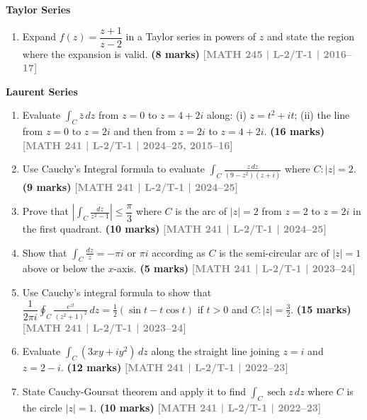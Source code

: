 \documentclass[12pt,a4paper]{article}
\newcommand{\yr}[1]{\hfill\textcolor{gray}{\small\textbf{[#1]}}}
\newcommand{\mk}[1]{\textcolor{orange!70!black}{\small\textbf{(#1 marks)}}}
\newcommand{\subtopic}[2]{%
  \vspace{10pt}
  \noindent\begin{tcolorbox}[colback=#1!8,colframe=#1,boxrule=0.6pt,arc=4pt,
    left=6pt,right=6pt,top=4pt,bottom=4pt]
    \small\bfseries\textcolor{#1}{#2}
  \end{tcolorbox}
  \vspace{2pt}
}
\begin{document}
\subtopic{cE}{Taylor Series}
\label{sub:s5-taylor}

\begin{enumerate}\item Expand $f(z)=\dfrac{z+1}{z-2}$ in a Taylor series in powers of $z$ and state the region where the expansion is valid.
\mk{8} \yr{MATH 245 | L-2/T-1 | 2016--17}

\end{enumerate}

\subtopic{cE}{Laurent Series}
\label{sub:s5-laurent}

\begin{enumerate}\item Evaluate $\displaystyle\int_{C}\bar{z}\,dz$ from $z=0$ to $z=4+2i$ along: (i) $z=t^{2}+it$; (ii) the line from $z=0$ to $z=2i$ and then from $z=2i$ to $z=4+2i$.
\mk{16} \yr{MATH 241 | L-2/T-1 | 2024--25, 2015--16}

\item Use Cauchy's Integral formula to evaluate $\displaystyle\int_{C}\frac{z\,dz}{(9-z^{2})(z+i)}$ where $C:|z|=2$.
\mk{9} \yr{MATH 241 | L-2/T-1 | 2024--25}

\item Prove that $\left|\displaystyle\int_{C}\frac{dz}{z^{2}-1}\right|\le\dfrac{\pi}{3}$ where $C$ is the arc of $|z|=2$ from $z=2$ to $z=2i$ in the first quadrant.
\mk{10} \yr{MATH 241 | L-2/T-1 | 2024--25}


\item Show that $\displaystyle\int_{C}\frac{dz}{z}=-\pi i$ or $\pi i$ according as $C$ is the semi-circular arc of $|z|=1$ above or below the $x$-axis.
\mk{5} \yr{MATH 241 | L-2/T-1 | 2023--24}

\item Use Cauchy's integral formula to show that $\dfrac{1}{2\pi i}\displaystyle\oint_{C}\frac{e^{zt}}{(z^{2}+1)^{2}}\,dz=\tfrac{1}{2}(\sin t - t\cos t)$ if $t>0$ and $C:|z|=\tfrac{3}{2}$.
\mk{15} \yr{MATH 241 | L-2/T-1 | 2023--24}

\item Evaluate $\displaystyle\int_{C}(3xy+iy^{2})\,dz$ along the straight line joining $z=i$ and $z=2-i$.
\mk{12} \yr{MATH 241 | L-2/T-1 | 2022--23}

\item State Cauchy-Goursat theorem and apply it to find $\displaystyle\int_{C}\operatorname{sech}z\,dz$ where $C$ is the circle $|z|=1$.
\mk{10} \yr{MATH 241 | L-2/T-1 | 2022--23}


\end{enumerate}
\end{document}
